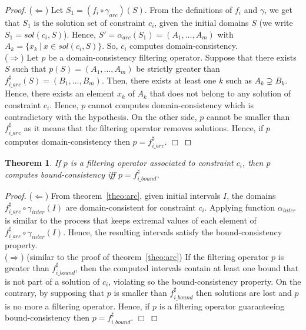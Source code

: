 \documentclass[submission,copyright,creativecommons]{eptcs}
\newtheorem{theorem}{Theorem}
\newtheorem{proof}{Proof}
\newcommand{\sh}[1]{\ensuremath{#1^\sharp}}
\begin{document}
\begin{proof}
  ($\Leftarrow$) Let $S_1 = (f_i \circ \gamma_{arc})(S)$. From the definitions of
  $f_i$ and $\gamma$, we get that $S_1$ is the solution set of constraint $c_i$,
  given the initial domains $S$ (we write $S_1 = sol(c_i,S)$).  Hence, $S' = \alpha_{arc}(S_1) =
  (A_1, \ldots, A_m)$ with \\$A_k = \{x_k~|~x \in sol(c_i,S)\}$.
  So, $c_i$ computes domain-consistency.\\
  ($\Rightarrow$) Let $p$ be a domain-consistency filtering operator. 
  Suppose that there exists $S$ such that 
  $p(S) = (A_1,\ldots,A_m)$ be strictly greater than
  $\sh{f_{i\_arc}}(S) = (B_1, \ldots, B_m)$.  Then, there exists at least 
  one $k$ such as $A_k \supsetneq B_k$. Hence, there exists an
  element $x_k$ of $A_k$ that does not belong to any solution of constraint $c_i$. 
  Hence, $p$ cannot computes domain-consistency which is contradictory with the hypothesis.
  On the other side, $p$ cannot be smaller than
  $\sh{f_{i\_arc}}$ as it means that the filtering operator removes solutions.
  Hence, if $p$ computes domain-consistency then $p = \sh{f_{i\_arc}}$.
 $\Box$
\end{proof}

\begin{theorem}
 If $p$ is a filtering operator associated to constraint $c_i$, then  $p$ computes 
 bound-consistency iff $p = \sh{f_{i\_bound}}$. 
\end{theorem}

\begin{proof}
  ($\Leftarrow$) From theorem~\ref{theo:arc}, given initial intervals $I$, 
  the domains $\sh{f_{i\_arc}} \circ \gamma_{inter}(I)$ are domain-consistent for constraint $c_i$.
  Applying function $\alpha_{inter}$ is similar to the process that keeps extremal values of each element of 
  $\sh{f_{i\_arc}} \circ \gamma_{inter}(I)$. Hence, the resulting intervals satisfy the 
  bound-consistency property.\\
  ($\Rightarrow$) (similar to the proof of theorem~\ref{theo:arc}) 
  If the filtering operator $p$ is greater than $\sh{f_{i\_bound}}$, 
  then the computed intervals contain at least one bound that is not part
  of a solution of $c_i$, violating so the bound-consistency property.
  On the contrary, by supposing that $p$ is smaller than
  $\sh{f_{i\_bound}}$ then solutions are lost and $p$ is no more a filtering operator.
  Hence, if $p$ is a filtering operator guaranteeing bound-consistency
  then $p = \sh{f_{i\_bound}}$. $\Box$
\end{proof}



\end{document}
